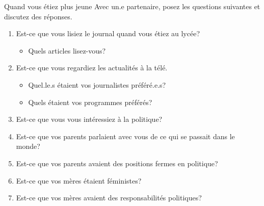 \begin{frame}{Quand vous étiez plus jeune}
  Avec un.e partenaire, posez les questions suivantes et discutez des réponses.
  \begin{enumerate}
    \item Est-ce que vous lisiez le journal quand vous étiez au lycée?
    \begin{itemize}
      \item Quels articles lisez-vous?
    \end{itemize}
    \item Est-ce que vous regardiez les actualités à la télé.
    \begin{itemize}
      \item Quel.le.s étaient vos journalistes préféré.e.s?
      \item Quels étaient vos programmes préférés?
    \end{itemize}
    \item Est-ce que vous vous intéressiez à la politique?
    \item Est-ce que vos parents parlaient avec vous de ce qui se passait dans le monde?
    \item Est-ce que vos parents avaient des positions fermes en politique?
    \item Est-ce que vos mères étaient féministes?
    \item Est-ce que vos mères avaient des responsabilités politiques?
  \end{enumerate}
\end{frame}